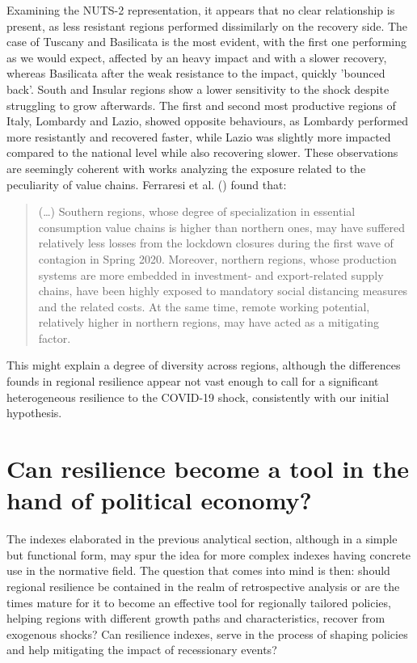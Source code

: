 \documentclass[12pt]{article}
\begin{document}
Examining the NUTS-2 representation, it appears that no clear relationship is present, as less resistant regions performed dissimilarly on the recovery side. The case of Tuscany and Basilicata is the most evident, with the first one performing as we would expect, affected by an heavy impact and with a slower recovery, whereas Basilicata after the weak resistance to the impact, quickly 'bounced back'. South and Insular regions show a lower sensitivity to the shock despite struggling to grow afterwards. The first and second most productive regions of Italy, Lombardy and Lazio, showed opposite behaviours, as Lombardy performed more resistantly and recovered faster, while Lazio was slightly more impacted compared to the national level while also recovering slower. These observations are seemingly coherent with works analyzing the exposure related to the peculiarity of value chains. Ferraresi et al. (\citeyear{ferraresi_economic_nodate}) found that:
\begin{quote}
(\dots) Southern regions, whose degree of specialization in essential consumption value chains is higher than northern ones, may have suffered relatively less losses from the lockdown closures during the first wave of contagion in Spring 2020. Moreover, northern regions, whose production systems are more embedded in investment- and export-related supply chains, have been highly exposed to mandatory social distancing measures and the related costs. At the same time, remote working potential, relatively higher in northern regions, may have acted as a mitigating factor.
\end{quote}
This might explain a degree of diversity across regions, although the differences founds in regional resilience appear not vast enough to call for a significant heterogeneous resilience to the COVID-19 shock, consistently with our initial hypothesis.

\section{Can resilience become a tool in the hand of political economy?}

The indexes elaborated in the previous analytical section, although in a simple but functional form, may spur the idea for more complex indexes having concrete use in the normative field. The question that comes into mind is then: should regional resilience be contained in the realm of retrospective analysis or are the times mature for it to become an effective tool for regionally tailored policies, helping regions with different growth paths and characteristics, recover from exogenous shocks? Can resilience indexes, serve in the process of shaping policies and help mitigating the impact of recessionary events?
\end{document}
